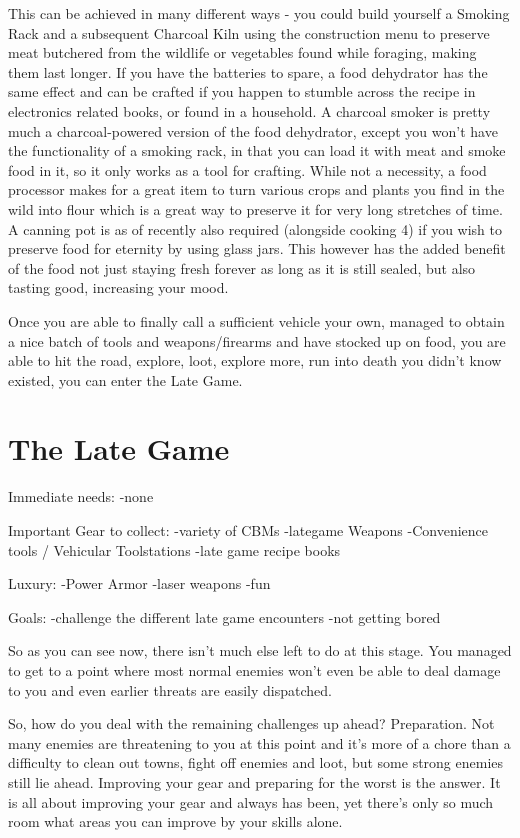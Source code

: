 \documentclass[11pt]{report}
\begin{document}
This can be achieved in many different ways - you could build yourself a Smoking Rack and a subsequent Charcoal Kiln using the construction menu to preserve meat butchered from the wildlife or vegetables found while foraging, making them last longer. If you have the batteries to spare, a food dehydrator has the same effect and can be crafted if you happen to stumble across the recipe in electronics related books, or found in a household. A charcoal smoker is pretty much a charcoal-powered version of the food dehydrator, except you won't have the functionality of a smoking rack, in that you can load it with meat and smoke food in it, so it only works as a tool for crafting. While not a necessity, a food processor makes for a great item to turn various crops and plants you find in the wild into flour which is a great way to preserve it for very long stretches of time. A canning pot is as of recently also required (alongside cooking 4) if you wish to preserve food for eternity by using glass jars. This however has the added benefit of the food not just staying fresh forever as long as it is still sealed, but also tasting good, increasing your mood.

Once you are able to finally call a sufficient vehicle your own, managed to obtain a nice batch of tools and weapons/firearms and have stocked up on food, you are able to hit the road, explore, loot, explore more, run into death you didn't know existed, you can enter the Late Game.

\section{The Late Game}

Immediate needs:
-none

Important Gear to collect:
-variety of CBMs
-lategame Weapons
-Convenience tools / Vehicular Toolstations
-late game recipe books

Luxury:
-Power Armor
-laser weapons
-fun

Goals:
-challenge the different late game encounters
-not getting bored

So as you can see now, there isn't much else left to do at this stage. You managed to get to a point where most normal enemies won't even be able to deal damage to you and even earlier threats are easily dispatched.

So, how do you deal with the remaining challenges up ahead? Preparation. Not many enemies are threatening to you at this point and it's more of a chore than a difficulty to clean out towns, fight off enemies and loot, but some strong enemies still lie ahead. Improving your gear and preparing for the worst is the answer. It is all about improving your gear and always has been, yet there's only so much room what areas you can improve by your skills alone.
\end{document}
